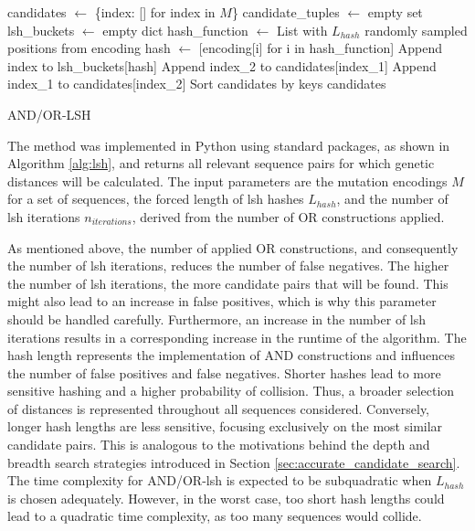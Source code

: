 \begin{algorithm}[ht!]
\begin{algorithmic}
\small
{}
    \State candidates $\gets$ \{index: [] for index in $M$\}
    \State candidate\_tuples $\gets$ empty set
        \State lsh\_buckets $\gets$ empty dict
        \State hash\_function $\gets$ List with $L_{hash}$ randomly sampled positions from encoding
            \State hash $\gets$ [encoding[i] for i in hash\_function]
            \State Append index to lsh\_buckets[hash]
        \EndFor
                \State Append index\_2 to candidates[index\_1]
                \State Append index\_1 to candidates[index\_2]
            \EndFor
        \EndFor
    \EndFor
    \State Sort candidates by keys
    \State \Return candidates
\EndFunction
\end{algorithmic}
\caption{AND/OR-LSH}
\label{alg:lsh}
\end{algorithm}


The method was implemented in Python using standard packages, as shown in Algorithm \ref{alg:lsh}, and returns all relevant sequence pairs for which genetic distances will be calculated.
The input parameters are the mutation encodings $M$ for a set of sequences, the forced length of \acrshort{lsh} hashes $L_{hash}$, and the number of \acrshort{lsh} iterations $n_{iterations}$, derived from the number of OR constructions applied.

As mentioned above, the number of applied OR constructions, and consequently the number of \acrshort{lsh} iterations, reduces the number of false negatives. The higher the number of \acrshort{lsh} iterations, the more candidate pairs that will be found. This might also lead to an increase in false positives, which is why this parameter should be handled carefully. Furthermore, an increase in the number of \acrshort{lsh} iterations results in a corresponding increase in the runtime of the algorithm. The hash length represents the implementation of AND constructions and influences the number of false positives and false negatives. Shorter hashes lead to more sensitive hashing and a higher probability of collision. Thus, a broader selection of distances is represented throughout all sequences considered. Conversely, longer hash lengths are less sensitive, focusing exclusively on the most similar candidate pairs. This is analogous to the motivations behind the depth and breadth search strategies introduced in Section \ref{sec:accurate_candidate_search}.
The time complexity for AND/OR-\acrshort{lsh} is expected to be subquadratic when $L_{hash}$ is chosen adequately. However, in the worst case, too short hash lengths could lead to a quadratic time complexity, as too many sequences would collide.

